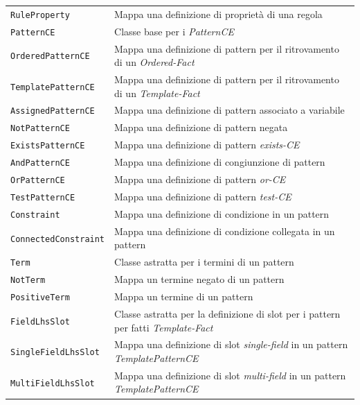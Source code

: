 \begin{longtable}{p{5.5cm}p{6.5cm}}
	\hdashline[1pt/5pt]
		\texttt{RuleProperty} & Mappa una definizione di proprietà di una regola\\
	\hdashline[1pt/5pt]
		\texttt{PatternCE} & Classe base per i \emph{PatternCE}\\
	\hdashline[1pt/5pt]
		\texttt{OrderedPatternCE} & Mappa una definizione di pattern per il ritrovamento di un \emph{Ordered-Fact}\\ 
	\hdashline[1pt/5pt]
		\texttt{TemplatePatternCE} & Mappa una definizione di pattern per il ritrovamento di un \emph{Template-Fact}\\ 
	\hdashline[1pt/5pt]
		\texttt{AssignedPatternCE} & Mappa una definizione di pattern associato a variabile\\ 
	\hdashline[1pt/5pt]
		\texttt{NotPatternCE} & Mappa una definizione di pattern negata\\ 
	\hdashline[1pt/5pt]
		\texttt{ExistsPatternCE} & Mappa una definizione di pattern \emph{exists-CE}\\ 
	\hdashline[1pt/5pt]
		\texttt{AndPatternCE} & Mappa una definizione di congiunzione di pattern\\ 
	\hdashline[1pt/5pt]
		\texttt{OrPatternCE} & Mappa una definizione di pattern \emph{or-CE}\\ 
	\hdashline[1pt/5pt]
		\texttt{TestPatternCE} & Mappa una definizione di pattern \emph{test-CE}\\
	\hdashline[1pt/5pt]
		\texttt{Constraint} & Mappa una definizione di condizione in un pattern\\ 
	\hdashline[1pt/5pt]
		\texttt{ConnectedConstraint} & Mappa una definizione di condizione collegata in un pattern\\ 
	\hdashline[1pt/5pt]
		\texttt{Term} & Classe astratta per i termini di un pattern\\ 
	\hdashline[1pt/5pt]
		\texttt{NotTerm} & Mappa un termine negato di un pattern\\ 
	\hdashline[1pt/5pt]
		\texttt{PositiveTerm} & Mappa un termine di un pattern\\ 
	\hdashline[1pt/5pt]
		\texttt{FieldLhsSlot} & Classe astratta per la definizione di slot per i pattern per fatti \emph{Template-Fact}\\ 
	\hdashline[1pt/5pt]
		\texttt{SingleFieldLhsSlot} & Mappa una definizione di slot \emph{single-field} in un pattern \emph{TemplatePatternCE}\\ 
	\hdashline[1pt/5pt]
		\texttt{MultiFieldLhsSlot} & Mappa una definizione di slot \emph{multi-field} in un pattern \emph{TemplatePatternCE}\\ 

\end{longtable}
